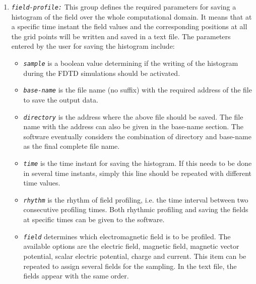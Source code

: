 \begin{enumerate}
\begin{itemize}
\end{itemize}
\item {\tt \small \em field-profile:} This group defines the required parameters for saving a histogram of the field over the whole computational domain. It means that at a specific time instant the field values and the corresponding positions at all the grid points will be written and saved in a text file. The parameters entered by the user for saving the histogram include:
%
\begin{itemize}
	\item {\tt \small \em sample} is a boolean value determining if the writing of the histogram during the FDTD simulations should be activated.
	\item {\tt \small \em base-name} is the file name (no suffix) with the required address of the file to save the output data.
	\item {\tt \small \em directory} is the address where the above file should be saved. The file name with the address can also be given in the base-name section. The software eventually considers the combination of directory and base-name as the final complete file name.
	\item {\tt \small \em time} is the time instant for saving the histogram. If this needs to be done in several time instants, simply this line should be repeated with different time values.
	\item {\tt \small \em rhythm} is the rhythm of field profiling, i.e. the time interval between two consecutive profiling times. Both rhythmic profiling and saving the fields at specific times can be given to the software.
	\item {\tt \small \em field} determines which electromagnetic field is to be profiled. The available options are the electric field, magnetic field, magnetic vector potential, scalar electric potential, charge and current. This item can be repeated to assign several fields for the sampling. In the text file, the fields appear with the same order.
\end{itemize}
\end{enumerate}

